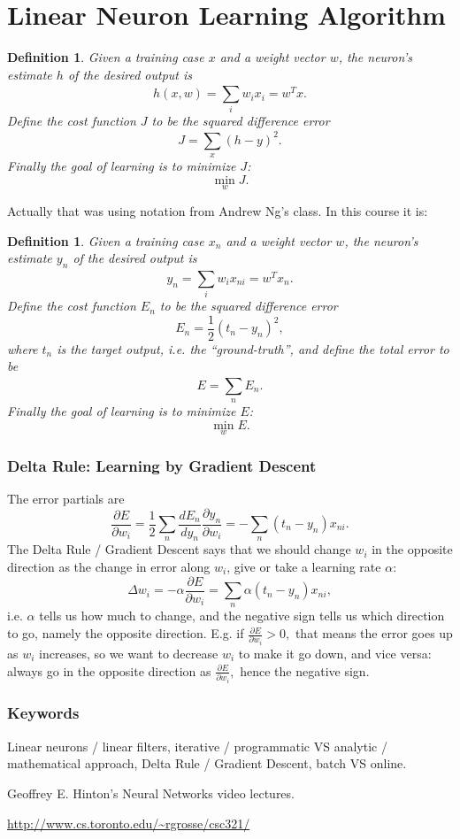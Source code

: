 \documentclass[12pt]{article}
\theoremstyle{plain}
\newtheorem{definition}[theorem]{Definition}
\theoremstyle{definition}
\theoremstyle{remark}
\begin{document}
\part{Linear Neuron Learning Algorithm}

\begin{definition}
Given a training case $x$ and a weight vector $w$, the neuron's estimate $h$ of the desired output is $$h(x, w) = \sum_{i}^{} w_i x_i = w^T x.$$ Define the cost function $J$ to be the squared difference error $$J = \sum_{x}^{} (h - y)^2.$$ Finally the goal of learning is to minimize $J$: $$\min_{w} J.$$
\end{definition}

Actually that was using notation from Andrew Ng's class. In this course it is:

\begin{definition}
Given a training case $x_n$ and a weight vector $w$, the neuron's estimate $y_n$ of the desired output is $$y_n = \sum_{i}^{} w_i x_{ni} = w^T x_n.$$ Define the cost function $E_n$ to be the squared difference error $$E_n = \frac{1}{2}(t_n - y_n)^2,$$ where $t_n$ is the target output, i.e. the ``ground-truth'', and define the total error to be $$E = \sum_{n}^{} E_n.$$ Finally the goal of learning is to minimize $E$: $$\min_{w} E.$$
\end{definition}

\section{Delta Rule: Learning by Gradient Descent}

The error partials are 
$$\frac{\partial E}{\partial w_i} = \frac{1}{2} \sum_n \frac{dE_n}{dy_n} \frac{\partial y_n}{\partial w_i} = - \sum_n (t_n - y_n) x_{ni}.$$
The Delta Rule / Gradient Descent says that we should change $w_i$ in the opposite direction as the change in error along $w_i$, give or take a learning rate $\alpha$:
$$\Delta w_i = - \alpha \frac{\partial E}{\partial w_i} = \sum_n \alpha (t_n - y_n) x_{ni},$$ i.e. $\alpha$ tells us how much to change, and the negative sign tells us which direction to go, namely the opposite direction. E.g. if $\frac{\partial E}{\partial w_i} > 0,$ that means the error goes up as $w_i$ increases, so we want to decrease $w_i$ to make it go down, and vice versa: always go in the opposite direction as $\frac{\partial E}{\partial w_i},$ hence the negative sign.

\section{Keywords}

Linear neurons / linear filters, iterative / programmatic VS analytic / mathematical approach, Delta Rule / Gradient Descent, batch VS online.

\begin{thebibliography}{99}

Geoffrey E. Hinton's Neural Networks video lectures.

\url{http://www.cs.toronto.edu/~rgrosse/csc321/}

\end{thebibliography}
\end{document}
